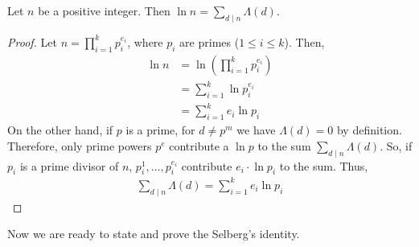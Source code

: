 \documentclass{subfile}
\begin{document}
	\begin{theorem}
		\label{thm:vonmangoldt}
		Let $n$ be a positive integer. Then $\ln n=\sum_{d\mid n}\Lambda(d)$.
	\end{theorem}

	\begin{proof}
		Let $n=\prod_{i=1}^kp_i^{e_i}$, where $p_i$ are primes ($1 \leq i \leq k$). Then,
			\begin{align*}
				\ln n  & =\ln\left(\prod_{i=1}^kp_i^{e_i}\right)\\
						&=\sum_{i=1}^k\ln{p_i^{e_i}}\\
						&=\sum_{i=1}^ke_i\ln p_i
			\end{align*}
		On the other hand, if $p$ is a prime, for $d\neq p^m$ we have $\Lambda(d)=0$ by definition. Therefore, only prime powers $p^e$ contribute a $\ln p$ to the sum $\sum_{d\mid n}\Lambda(d)$. So, if $p_i$ is a prime divisor of $n$, $p_i^1,\ldots,p_i^{e_i}$ contribute $e_i \cdot \ln p_i$ to the sum. Thus,
			\begin{align*}
				\sum_{d\mid n}\Lambda(d) = \sum\limits_{i=1}^ke_i\ln p_i
			\end{align*}

	\end{proof}
	Now we are ready to state and prove the Selberg's identity.
\end{document}
